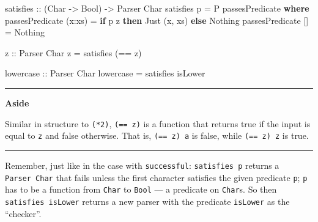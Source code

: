 \documentclass[]{article}
\newenvironment{Shaded}{}{}
\newcommand{\CharTok}[1]{\textcolor[rgb]{0.25,0.44,0.63}{#1}}
\newcommand{\DataTypeTok}[1]{\textcolor[rgb]{0.56,0.13,0.00}{#1}}
\newcommand{\FunctionTok}[1]{\textcolor[rgb]{0.02,0.16,0.49}{#1}}
\newcommand{\KeywordTok}[1]{\textcolor[rgb]{0.00,0.44,0.13}{\textbf{#1}}}
\newcommand{\NormalTok}[1]{#1}
\newcommand{\OperatorTok}[1]{\textcolor[rgb]{0.40,0.40,0.40}{#1}}
\newcommand{\OtherTok}[1]{\textcolor[rgb]{0.00,0.44,0.13}{#1}}
\begin{document}
\begin{Shaded}
\begin{Highlighting}[]
\OtherTok{satisfies ::}\NormalTok{ (}\DataTypeTok{Char} \OtherTok{{-}\textgreater{}} \DataTypeTok{Bool}\NormalTok{) }\OtherTok{{-}\textgreater{}} \DataTypeTok{Parser} \DataTypeTok{Char}
\NormalTok{satisfies p }\OtherTok{=} \DataTypeTok{P}\NormalTok{ passesPredicate}
    \KeywordTok{where}
\NormalTok{        passesPredicate (x}\OperatorTok{:}\NormalTok{xs) }\OtherTok{=}  \KeywordTok{if}\NormalTok{ p z}
                                      \KeywordTok{then} \DataTypeTok{Just}\NormalTok{ (x, xs)}
                                      \KeywordTok{else} \DataTypeTok{Nothing}
\NormalTok{        passesPredicate []     }\OtherTok{=}  \DataTypeTok{Nothing}


\OtherTok{z ::} \DataTypeTok{Parser} \DataTypeTok{Char}
\NormalTok{z }\OtherTok{=}\NormalTok{ satisfies (}\OperatorTok{==} \CharTok{\textquotesingle{}z\textquotesingle{}}\NormalTok{)}

\OtherTok{lowercase ::} \DataTypeTok{Parser} \DataTypeTok{Char}
\NormalTok{lowercase }\OtherTok{=}\NormalTok{ satisfies }\FunctionTok{isLower}
\end{Highlighting}
\end{Shaded}

\begin{center}\rule{0.5\linewidth}{0.5pt}\end{center}

\textbf{Aside}

Similar in structure to \texttt{(*2)},
\texttt{(==\ \textquotesingle{}z\textquotesingle{})} is a function that returns
true if the input is equal to \texttt{\textquotesingle{}z\textquotesingle{}} and
false otherwise. That is,
\texttt{(==\ \textquotesingle{}z\textquotesingle{})\ \textquotesingle{}a\textquotesingle{}}
is false, while
\texttt{(==\ \textquotesingle{}z\textquotesingle{})\ \textquotesingle{}z\textquotesingle{}}
is true.

\begin{center}\rule{0.5\linewidth}{0.5pt}\end{center}

Remember, just like in the case with \texttt{successful}: \texttt{satisfies\ p}
returns a \texttt{Parser\ Char} that fails unless the first character satisfies
the given predicate \texttt{p}; \texttt{p} has to be a function from
\texttt{Char} to \texttt{Bool} --- a predicate on \texttt{Char}s. So then
\texttt{satisfies\ isLower} returns a new parser with the predicate
\texttt{isLower} as the ``checker''.
\end{document}
